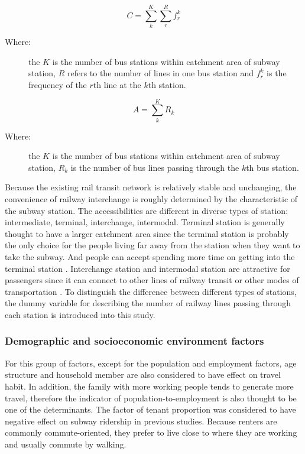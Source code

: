 \begin{equation}
	C=\sum_{k}^{K}\sum_{r}^{R}f_{r}^{k}
	\label{eq:chp2:BusCapacity}
\end{equation}

\begin{description}
	\item[Where:]
	the $K$ is the number of bus stations within catchment area of subway station, $R$ refers to the number of lines in one bus station and $f_r^k$ is the frequency of the $r$th line at the $k$th station.
\end{description}

\begin{equation}
	A=\sum_{k}^{K}R_{k}
	\label{eq:chp2:BusAccessibility}
\end{equation}

\begin{description}
	\item[Where:]
	the $K$ is the number of bus stations within catchment area of subway station, $R_k$ is the number of bus lines passing through the $k$th bus station.
\end{description}

%
Because the existing rail transit network is relatively stable and unchanging, the convenience of railway interchange is roughly determined by the characteristic of the subway station. The accessibilities are different in diverse types of station: intermediate, terminal, interchange, intermodal. Terminal station is generally thought to have a larger catchment area since the terminal station is probably the only choice for the people living far away from the station when they want to take the subway. And people can accept spending more time on getting into the terminal station \cite{o1996walking}. Interchange station and intermodal station are attractive for passengers since it can connect to other lines of railway transit or other modes of transportation \cite{kuby2004factors}. To distinguish the difference between different types of stations, the dummy variable for describing the number of railway lines passing through each station is introduced into this study.

%
\subsubsection{Demographic and socioeconomic environment factors}
%
For this group of factors, except for the population and employment factors, age structure and household member are also considered to have effect on travel habit. In addition, the family with more working people tends to generate more travel, therefore the indicator of population-to-employment is also thought to be one of the determinants. The factor of tenant proportion was considered to have negative effect on subway ridership in previous studies. Because renters are commonly commute-oriented, they prefer to live close to where they are working and usually commute by walking.

